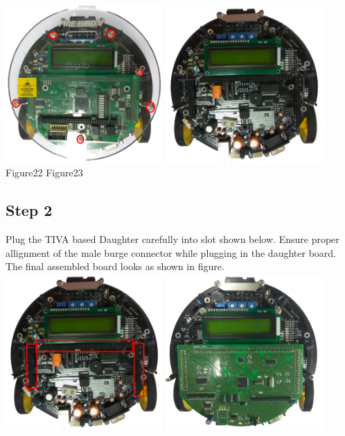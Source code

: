 \documentclass[a4paper,12pt,oneside]{book}
\begin{document}
\includegraphics[width=6cm, height=6cm]{Images/1}
\includegraphics[width=6cm, height=6cm]{Images/2}\\

\hspace{2cm}
Figure22
\hspace{4.5cm}
Figure23

\subsection*{Step 2}
Plug the TIVA based Daughter carefully into slot shown below. Ensure proper allignment of the male burge connector while plugging in the daughter board. The final assembled board looks as shown in figure.\\ 
\includegraphics[width=6cm, height=6cm]{Images/3}
\includegraphics[width=6cm, height=6cm]{Images/4}\\
\end{document}
